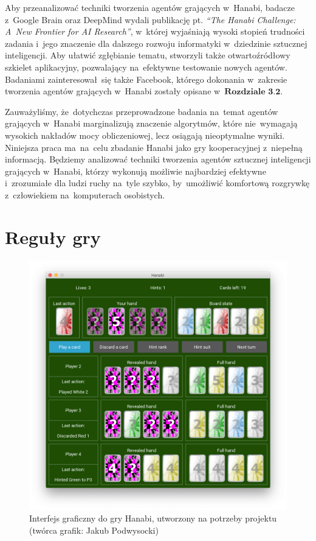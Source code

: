 \documentclass[declaration,shortabstract,inz]{iithesis}
\begin{document}
Aby przeanalizować techniki tworzenia agentów grających w~Hanabi, badacze z~Google Brain oraz DeepMind wydali publikację pt. \textit{``The Hanabi Challenge: A~New Frontier for AI Research''}\cite{OurInspiration}, w~której wyjaśniają wysoki stopień trudności zadania i~jego znaczenie dla dalszego rozwoju informatyki w~dziedzinie sztucznej inteligencji. Aby ułatwić zgłębianie tematu, stworzyli także otwartoźródłowy szkielet aplikacyjny, pozwalający na~efektywne testowanie nowych agentów. Badaniami zainteresował~się także Facebook, którego dokonania w~zakresie tworzenia agentów grających w~Hanabi zostały opisane w~$\hyperref[sec:fb]{\textbf{Rozdziale~3.2}}$.

Zauważyliśmy, że~dotychczas przeprowadzone badania na~temat agentów grających w~Hanabi marginalizują znaczenie algorytmów, które nie~wymagają wysokich nakładów mocy obliczeniowej, lecz osiągają nieoptymalne wyniki. Niniejsza praca ma~na~celu zbadanie Hanabi jako gry kooperacyjnej z~niepełną informacją. Będziemy analizować techniki tworzenia agentów sztucznej inteligencji grających w~Hanabi, którzy wykonują możliwie najbardziej efektywne i~zrozumiałe dla ludzi ruchy na~tyle szybko, by~umożliwić komfortową rozgrywkę z~człowiekiem na~komputerach osobistych.


\chapter{Reguły gry}
\label{sec:rules}

\begin{figure}[ht!]
	\centering
	\captionsetup{format=hang}
	\includegraphics[width=\textwidth,height=\textheight,keepaspectratio]{gui.png}
	\caption[Caption]{Interfejs graficzny do gry Hanabi, utworzony na potrzeby projektu (twórca grafik: Jakub Podwysocki)}
	\label{fig:gui}
\end{figure}
\end{document}
